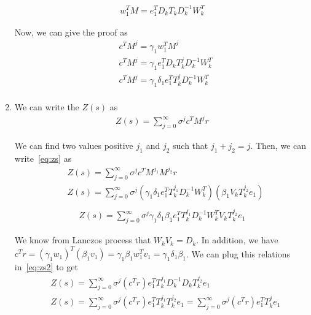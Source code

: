 \begin{enumerate}
\begin{align*}
w_{1}^{T}M = e_{1}^{T} D_{k}T_{k}D^{-1}_{k} W_{k}^{T}
\end{align*}

Now, we can give the proof as 
\begin{align*}
&c^{T}M^{j} = \gamma_{1}w_{1}^{T}M^{j} \\
&c^{T}M^{j} = \gamma_{1}e_{1}^{T} D_{k}T_{k}^{j}D^{-1}_{k} W_{k}^{T} \\
&c^{T}M^{j} = \gamma_{1}\delta_{1}e_{1}^{T}T_{k}^{j}D^{-1}_{k} W_{k}^{T} \\
\end{align*}

\item We can write the $Z(s)$ as 
\begin{align}
Z(s) = \sum_{j=0}^{\infty} \sigma^{j}c^{T}M^{j}r
\label{eq:zs}
\end{align}


We can find two values positive $j_{1}$ and $j_{2}$ such that $j_{1}+j_{2} = j$. Then, we can write~\ref{eq:zs} as 
\begin{align*}
&Z(s) = \sum_{j=0}^{\infty} \sigma^{j}c^{T}M^{j_{1}}M^{j_{2}}r\\
&Z(s) = \sum_{j=0}^{\infty} \sigma^{j} (\gamma_{1}\delta_{1}e_{1}^{T}T_{k}^{j_{1}}D^{-1}_{k} W_{k}^{T})(\beta_{1}V_{k}T_{k}^{j_{2}}e_{1})\\
\end{align*}
\begin{align}
Z(s) = \sum_{j=0}^{\infty} \sigma^{j} \gamma_{1}\delta_{1}\beta_{1}e_{1}^{T}T_{k}^{j_{1}}D_{k}^{-1}W_{k}^{T}V_{k}T_{k}^{j_{2}}e_{1}
\label{eq:zs2}
\end{align}

We know from Lanczos process that $W_{k}V_{k} = D_{k}$. In addition, we have $c^{T}r = (\gamma_{1}w_{1})^{T}(\beta_{1}v_{1}) = \gamma_{1}\beta_{1}w_{1}^{T}v_{1}=\gamma_{1}\delta_{1}\beta_{1}$. We can plug this relations in~\ref{eq:zs2} to get
\begin{align*}
&Z(s) = \sum_{j=0}^{\infty} \sigma^{j} (c^{T}r)e_{1}^{T}T_{k}^{j_{1}}D_{k}^{-1}D_{k}T_{k}^{j_{2}}e_{1}\\
&Z(s) = \sum_{j=0}^{\infty} \sigma^{j} (c^{T}r)e_{1}^{T}T_{k}^{j_{1}}T_{k}^{j_{2}}e_{1} = \sum_{j=0}^{\infty} \sigma^{j} (c^{T}r)e_{1}^{T}T_{k}^{j}e_{1}\\
\end{align*}

\end{enumerate}
